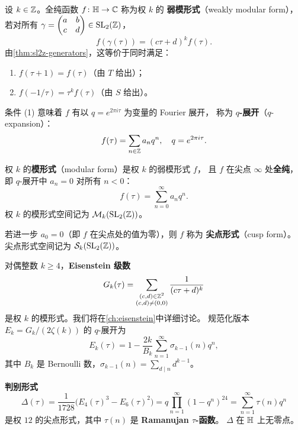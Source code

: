 \begin{definition}[权 $k$ 的弱模形式]
\label{def:weakly-modular}
设 $k \in \mathbb{Z}$。全纯函数 $f\colon \mathbb{H} \to \mathbb{C}$ 称为权 $k$ 的
\textbf{弱模形式}（weakly modular form），若对所有
$\gamma = \begin{pmatrix} a & b \\ c & d \end{pmatrix} \in \mathrm{SL}_2(\mathbb{Z})$，
\[
  f(\gamma(\tau)) = (c\tau + d)^k f(\tau).
\]
由\cref{thm:sl2z-generators}，这等价于同时满足：
\begin{enumerate}
  \item $f(\tau + 1) = f(\tau)$（由 $T$ 给出）；
  \item $f(-1/\tau) = \tau^k f(\tau)$（由 $S$ 给出）。
\end{enumerate}
\end{definition}

条件 (1) 意味着 $f$ 有以 $q = e^{2\pi i\tau}$ 为变量的 Fourier 展开，
称为 \textbf{$q$-展开}（$q$-expansion）：
\[
  f(\tau) = \sum_{n \in \mathbb{Z}} a_n q^n, \quad q = e^{2\pi i\tau}.
\]

\begin{definition}[模形式与尖点形式]
\label{def:modular-form}
权 $k$ 的\textbf{模形式}（modular form）是权 $k$ 的弱模形式 $f$，
且 $f$ 在尖点 $\infty$ 处\textbf{全纯}，即 $q$-展开中 $a_n = 0$ 对所有 $n < 0$：
\[
  f(\tau) = \sum_{n=0}^{\infty} a_n q^n.
\]
权 $k$ 的模形式空间记为 $\mathcal{M}_k(\mathrm{SL}_2(\mathbb{Z}))$。

若进一步 $a_0 = 0$（即 $f$ 在尖点处的值为零），则 $f$ 称为
\textbf{尖点形式}（cusp form）。尖点形式空间记为 $\mathcal{S}_k(\mathrm{SL}_2(\mathbb{Z}))$。
\end{definition}

\begin{example}[Eisenstein 级数]
\label{ex:eisenstein-preview}
对偶整数 $k \geq 4$，\textbf{Eisenstein 级数}
\[
  G_k(\tau) = \sum_{\substack{(c,d) \in \mathbb{Z}^2 \\ (c,d) \neq (0,0)}}
  \frac{1}{(c\tau + d)^k}
\]
是权 $k$ 的模形式。我们将在\cref{ch:eisenstein}中详细讨论。
规范化版本 $E_k = G_k / (2\zeta(k))$ 的 $q$-展开为
\[
  E_k(\tau) = 1 - \frac{2k}{B_k} \sum_{n=1}^{\infty} \sigma_{k-1}(n) q^n,
\]
其中 $B_k$ 是 Bernoulli 数，$\sigma_{k-1}(n) = \sum_{d \mid n} d^{k-1}$。
\end{example}

\begin{example}
\label{ex:discriminant-form}
\textbf{判别形式}
\[
  \Delta(\tau) = \frac{1}{1728}\bigl(E_4(\tau)^3 - E_6(\tau)^2\bigr)
  = q \prod_{n=1}^{\infty}(1 - q^n)^{24}
  = \sum_{n=1}^{\infty} \tau(n) q^n
\]
是权 $12$ 的尖点形式，其中 $\tau(n)$ 是 \textbf{Ramanujan $\tau$-函数}。
$\Delta$ 在 $\mathbb{H}$ 上无零点。
\end{example}

